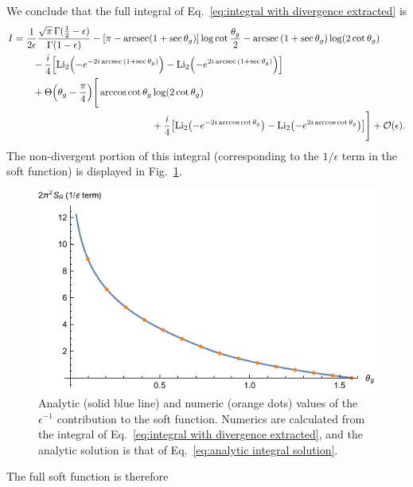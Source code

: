 \documentclass[11pt,twoside,reqno]{amsart}
\theoremstyle{plain}
\theoremstyle{remark}
\theoremstyle{definition}
\theoremstyle{remark}
\theoremstyle{definition}
\theoremstyle{definition}
\newcommand{\cO}{\mathcal{O}}
\newcommand{\Li}{\mathrm{Li}}
\begin{document}
	We conclude that the full integral of Eq.~\ref{eq:integral with divergence extracted} is
	\begin{equation}\label{eq:analytic integral solution}
	\begin{aligned}
		I &= \frac{1}{2\epsilon}\frac{\sqrt{\pi} \, \Gamma(\frac{1}{2} - \epsilon)}{\Gamma(1 - \epsilon)} - \qty[\pi - \arcsec(1 + \sec\theta_g)]\log\cot\frac{\theta_g}{2} - \arcsec\qty(1 + \sec\theta_g) \log(2\cot\theta_g) \\
			&\qquad - \frac{i}{4}\qty[\Li_2\qty(-e^{-2i\arcsec\qty(1 + \sec\theta_g)}) - \Li_2\qty(-e^{2i\arcsec\qty(1 + \sec\theta_g)})] \\
			&\qquad+ \Theta\qty(\theta_g - \frac{\pi}{4})\Bigg[ \arccos\cot\theta_g \log(2\cot\theta_g) \\
			&\hspace{5cm}+ \frac{i}{4}\qty[\Li_2\qty(-e^{-2i\arccos\cot\theta_g}) - \Li_2\qty(-e^{2i\arccos\cot\theta_g})] \Bigg] + \cO(\epsilon).
	\end{aligned}
	\end{equation}
	The non-divergent portion of this integral (corresponding to the $1/\epsilon$ term in the soft function) is displayed in Fig.~\ref{fig:non-divergent integral}.
	\begin{figure}
		\includegraphics[width=0.75\columnwidth]{figures/full_non_divergent.pdf}
		\caption{\label{fig:non-divergent integral} Analytic (solid blue line) and numeric (orange dots) values of the $\epsilon^{-1}$ contribution to the soft function. Numerics are calculated from the integral of Eq.~\ref{eq:integral with divergence extracted}, and the analytic solution is that of Eq.~\ref{eq:analytic integral solution}.}
	\end{figure}
	The full soft function is therefore
\end{document}
